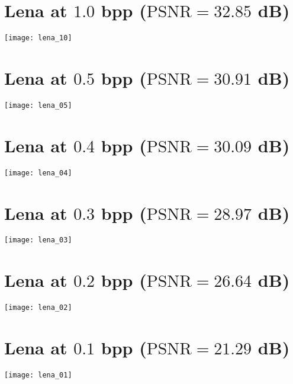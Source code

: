 \section*{Lena at $1.0$ bpp ($\text{PSNR}=32.85$ dB)}
\begin{center}
  \texttt{[image: lena\_10]}
\end{center}

\section*{Lena at $0.5$ bpp ($\text{PSNR}=30.91$ dB)}
\begin{center}
  \texttt{[image: lena\_05]}
\end{center}

\section*{Lena at $0.4$ bpp ($\text{PSNR}=30.09$ dB)}
\begin{center}
  \texttt{[image: lena\_04]}
\end{center}

\section*{Lena at $0.3$ bpp ($\text{PSNR}=28.97$ dB)}
\begin{center}
  \texttt{[image: lena\_03]}
\end{center}

\section*{Lena at $0.2$ bpp ($\text{PSNR}=26.64$ dB)}
\begin{center}
  \texttt{[image: lena\_02]}
\end{center}

\section*{Lena at $0.1$ bpp ($\text{PSNR}=21.29$ dB)}
\begin{center}
  \texttt{[image: lena\_01]}
\end{center}

